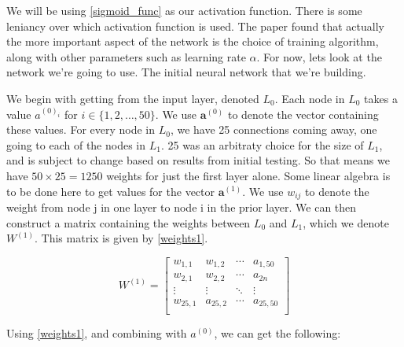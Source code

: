 We will be using \ref{sigmoid_func} as our activation function. There is some leniancy over which activation function is used. The paper \cite{sibi} found that actually the more important aspect of 
the network is the choice of training algorithm, along with other parameters such as learning rate $\alpha$. For now, lets look at the network we're going to use. The initial neural network that we're building. 

We begin with getting from the input layer, denoted $L_0$. Each node in $L_0$ takes a value $a^{(0)_i}$ for $i \in \{1,2,\ldots,50\}$. We use $\textbf{a}^{(0)}$ to denote the vector
containing these values. For every node in $L_0$, we have 25 connections coming away, one going to each of the nodes in $L_1$. 25 was an arbitraty choice for the size of $L_1$, and is
subject to change based on results from initial testing. So that means we have $50 \times 25 = 1250$ weights for just the first layer alone. Some linear algebra is to be done here to get 
values for the vector $\textbf{a}^{(1)}$. We use $w_{ij}$ to denote the weight from node j in one layer to node i in the prior layer. We can then construct a matrix containing the weights
between $L_0$ and $L_1$, which we denote $W^{(1)}$. This matrix is given by \ref{weights1}.

\begin{equation}
    W^{(1)} =
    \left[ {\begin{array}{cccc}
      w_{1,1} & w_{1,2} & \cdots & a_{1,50}\\
      w_{2,1} & w_{2,2} & \cdots & a_{2n}\\
      \vdots & \vdots & \ddots & \vdots\\
      w_{25,1} & a_{25,2} & \cdots & a_{25,50}\\
    \end{array} } \right]
    \label{weights1}
\end{equation}

Using \ref{weights1}, and combining with $a^{(0)}$, we can get the following:

